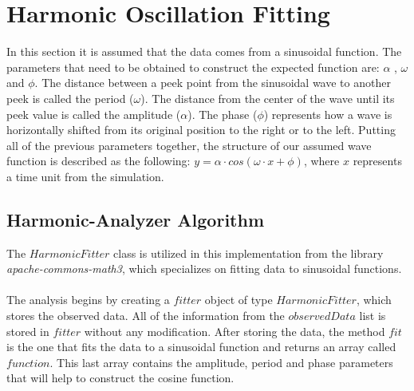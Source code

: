 

\section{Harmonic Oscillation Fitting}
In this section it is assumed that the data comes from a sinusoidal function.
%
The parameters that need to be obtained to construct the expected function are: $\alpha$ , $\omega$ and $\phi$.
%
%
The distance between a peek point from the sinusoidal wave to another peek is called the period ($\omega$). 
%
The distance from the center of the wave until its peek value is called the amplitude ($\alpha$).
%
The phase ($\phi$) represents how a wave is horizontally shifted from its original position to the right or to the left. 
%
Putting all of the previous parameters together, the structure of our assumed wave function is described as the following: $y = \alpha \cdot cos (\omega \cdot x + \phi)$, where $x$ represents a time unit from the simulation. 

\subsection{Harmonic-Analyzer Algorithm}
The $HarmonicFitter$ class is utilized in this implementation from the library \textit{apache-commons-math3}, which specializes on fitting data to sinusoidal functions. 
%
\\
\\
The analysis begins by creating a $fitter$ object of type $HarmonicFitter$, which stores the observed data.
%
All of the information from the $observedData$ list is stored in $fitter$ without any modification. 
%
After storing the data, the method $fit$ is the one that fits the data to a sinusoidal function and returns an array called $function$. 
%
This last array contains the amplitude, period and phase parameters that will help to construct the cosine function. 



